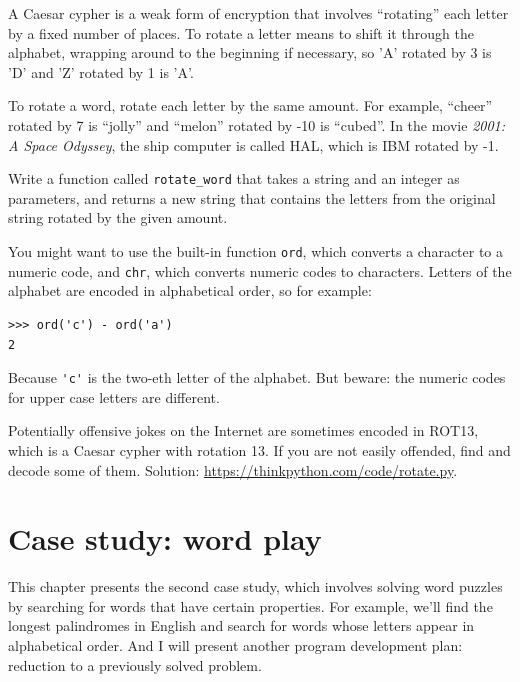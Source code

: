 \documentclass[10pt]{book}
\begin{document}
\begin{exercise}

\label{exrotate}
A Caesar cypher is a weak form of encryption that involves ``rotating'' each
letter by a fixed number of places.  To rotate a letter means
to shift it through the alphabet, wrapping around to the beginning if
necessary, so 'A' rotated by 3 is 'D' and 'Z' rotated by 1 is 'A'.

To rotate a word, rotate each letter by the same amount.
For example, ``cheer'' rotated by 7 is ``jolly'' and ``melon'' rotated
by -10 is ``cubed''.  In the movie {\em 2001: A Space Odyssey}, the
ship computer is called HAL, which is IBM rotated by -1.


Write a function called \verb"rotate_word"
that takes a string and an integer as parameters, and returns
a new string that contains the letters from the original string
rotated by the given amount.

You might want to use the built-in function {\tt ord}, which converts
a character to a numeric code, and {\tt chr}, which converts numeric
codes to characters.  Letters of the alphabet are encoded in alphabetical
order, so for example:

\begin{verbatim}
>>> ord('c') - ord('a')
2
\end{verbatim}

Because \verb"'c'" is the two-eth letter of the alphabet.  But
beware: the numeric codes for upper case letters are different.

Potentially offensive jokes on the Internet are sometimes encoded in
ROT13, which is a Caesar cypher with rotation 13.  If you are not
easily offended, find and decode some of them.  Solution:
\url{https://thinkpython.com/code/rotate.py}.

\end{exercise}


\chapter{Case study: word play}
\label{wordplay}

This chapter presents the second case study, which involves
solving word puzzles by searching for words that have certain
properties.  For example, we'll find the longest palindromes
in English and search for words whose letters appear in
alphabetical order.  And I will present another program development
plan: reduction to a previously solved problem.
\end{document}
